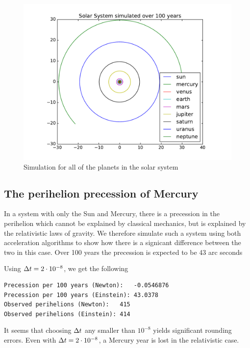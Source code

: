 \documentclass[a4paper]{article}
\begin{document}
\begin{figure}[htb]
\includegraphics[width=\textwidth]{fig/solar_system.pdf}
\caption{Simulation for all of the planets in the solar system}
\label{fig:solar_system}
\end{figure}


\subsection{The perihelion precession of Mercury}
In a system with only the Sun and Mercury, there is a precession in the perihelion which cannot be explained by classical mechanics, but is explained by the relativistic laws of gravity. We therefore simulate such a system using both acceleration algorithms to show how there is a signicant difference between the two in this case. Over 100 years the precession is expected to be 43 arc seconds

Using ${\Delta t}=2 \cdot 10^{-8}$, we get the following

\begin{lstlisting}[basicstyle=\footnotesize, frame=single, label={lst:precession},caption=Perihelion precession of Mercury]
Precession per 100 years (Newton):   -0.0546876
Precession per 100 years (Einstein): 43.0378
Observed perihelions (Newton):   415
Observed perihelions (Einstein): 414
\end{lstlisting}

It seems that choosing ${\Delta t}$ any smaller than $10^{-8}$ yields significant rounding errors. Even with ${\Delta t}=2 \cdot 10^{-8}$, a Mercury year is lost in the relativistic case.
\end{document}
